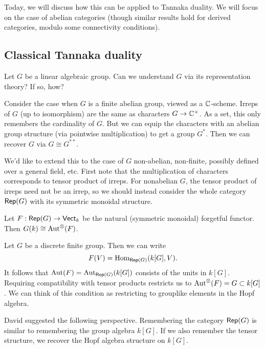\documentclass{article}
\begin{document}
Today, we will discuss how this can be applied to Tannaka duality.
We will focus on the case of abelian categories (though similar results hold for derived categories, modulo some connectivity conditions).

\subsection{Classical Tannaka duality}

Let $G$ be a linear algebraic group.
Can we understand $G$ via its representation theory?
If so, how?

\begin{ex}
	Consider the case when $G$ is a finite abelian group, viewed as a $\mathbb{C}$-scheme.
	Irreps of $G$ (up to isomorphism) are the same as characters $G \to \mathbb{C}^\times$.
	As a set, this only remembers the cardinality of $G$.
	But we can equip the characters with an abelian group structure (via pointwise multiplication) to get a group $G^*$.
	Then we can recover $G$ via $G \cong G^{**}$.
\end{ex}

We'd like to extend this to the case of $G$ non-abelian, non-finite, possibly defined over a general field, etc.
First note that the multiplication of characters corresponds to tensor product of irreps.
For nonabelian $G$, the tensor product of irreps need not be an irrep, so we should instead consider the whole category $\mathsf{Rep}(G)$ with its symmetric monoidal structure.

\begin{thm}
	Let $F: \mathsf{Rep}(G) \to \mathsf{Vect}_k$ be the natural (symmetric monoidal) forgetful functor.
	Then $G(k) \cong \operatorname{Aut}^\otimes(F)$.
\end{thm}

\begin{ex}
	Let $G$ be a discrete finite group.
	Then we can write
	\[
		F(V) = \operatorname{Hom}_{\mathsf{Rep}(G)}(k[G], V).
	\]
	It follows that $\operatorname{Aut}(F) = \operatorname{Aut}_{\mathsf{Rep}(G)}(k[G])$ consists of the units in $k[G]$.
	Requiring compatibility with tensor products restricts us to $\operatorname{Aut}^\otimes(F) = G \subset k[G]$.
	We can think of this condition as restricting to grouplike elements in the Hopf algebra.
\end{ex}

David suggested the following perspective.
Remembering the category $\mathsf{Rep}(G)$ is similar to remembering the group algebra $k[G]$.
If we also remember the tensor structure, we recover the Hopf algebra structure on $k[G]$.
\end{document}
